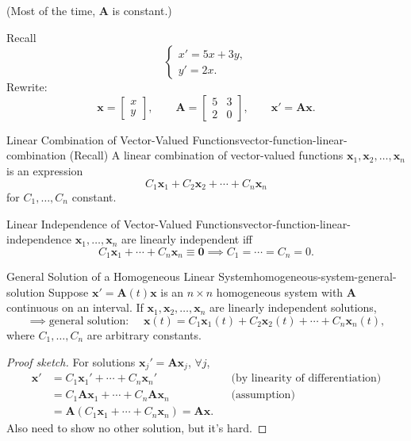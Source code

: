 (Most of the time, $\mathbf{A}$ is constant.)

\begin{example}
  Recall
  \[
    \begin{cases}
      x'=5x+3y, \\
      y'=2x.
    \end{cases}
  \]
  Rewrite:
  \[
    \mathbf{x}=
    \begin{bmatrix}
      x \\y
    \end{bmatrix}
    ,\qquad
    \mathbf{A}=
    \begin{bmatrix}
      5 & 3 \\2&0
    \end{bmatrix}
    ,\qquad
    \mathbf{x}'=\mathbf{A}\mathbf{x}.
  \]
\end{example}

\begin{definition}{Linear Combination of Vector-Valued Functions}{vector-function-linear-combination}
  (Recall) A linear combination of vector-valued functions
  $\mathbf{x}_1,\mathbf{x}_2,\ldots,\mathbf{x}_n$ is an expression
  \[
    C_1\mathbf{x}_1+C_2\mathbf{x}_2+\cdots+C_n\mathbf{x}_n
  \]
  for $C_1,\ldots,C_n$ constant.
\end{definition}

\begin{definition}{Linear Independence of Vector-Valued Functions}{vector-function-linear-independence}
  $\mathbf{x}_1,\ldots,\mathbf{x}_n$ are linearly independent iff
  \[
    C_1\mathbf{x}_1+\cdots+C_n\mathbf{x}_n\equiv\mathbf{0}
    \implies C_1=\cdots=C_n=0.
  \]
\end{definition}

\begin{theorem}{General Solution of a Homogeneous Linear System}{homogeneous-system-general-solution}
  Suppose $\mathbf{x}'=\mathbf{A}(t)\mathbf{x}$ is an $n\times n$ homogeneous
  system with $\mathbf{A}$ continuous on an interval.
  If $\mathbf{x}_1,\mathbf{x}_2,\ldots,\mathbf{x}_n$ are linearly independent solutions,
  \[
    \implies\text{general solution: }\quad
    \mathbf{x}(t)=C_1\mathbf{x}_1(t)+C_2\mathbf{x}_2(t)+\cdots+C_n\mathbf{x}_n(t),
  \]
  where $C_1,\ldots,C_n$ are arbitrary constants.
\end{theorem}

\begin{proof}[Proof sketch]
  For solutions $\mathbf{x}_j'=\mathbf{A}\mathbf{x}_j$, $\forall j$,
  \begin{align*}
    \mathbf{x}' & =C_1\mathbf{x}_1'+\cdots+C_n\mathbf{x}_n'
                &                                                             & \text{(by linearity of differentiation)} \\
                & =C_1\mathbf{A}\mathbf{x}_1+\cdots+C_n\mathbf{A}\mathbf{x}_n
                &                                                             & \text{(assumption)}                      \\
                & =\mathbf{A}(C_1\mathbf{x}_1+\cdots+C_n\mathbf{x}_n)
    =\mathbf{A}\mathbf{x}.
  \end{align*}
  Also need to show no other solution, but it's hard.
\end{proof}

